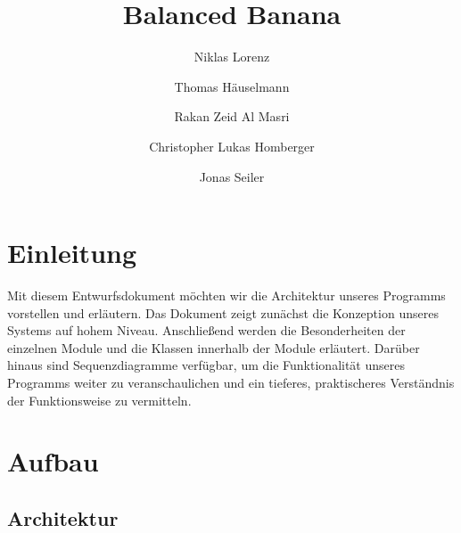 \documentclass[a4paper,12pt]{article}
\title{Balanced Banana}
\author{Niklas Lorenz \and Thomas Häuselmann \and Rakan Zeid Al Masri \and Christopher Lukas Homberger \and Jonas Seiler}
\begin{document}
\setcounter{page}{2}
\tableofcontents          %
\clearpage
{}

\section{Einleitung}
\vspace{1cm}
Mit diesem Entwurfsdokument möchten wir die Architektur unseres Programms vorstellen und erläutern. Das Dokument zeigt zunächst die Konzeption unseres Systems auf hohem Niveau. Anschließend werden die Besonderheiten der einzelnen Module und die Klassen innerhalb der Module erläutert. Darüber hinaus sind Sequenzdiagramme verfügbar, um die Funktionalität unseres Programms weiter zu veranschaulichen und ein tieferes, praktischeres Verständnis der Funktionsweise zu vermitteln.
\clearpage
\section{Aufbau}

\subsection{Architektur}
\end{document}
